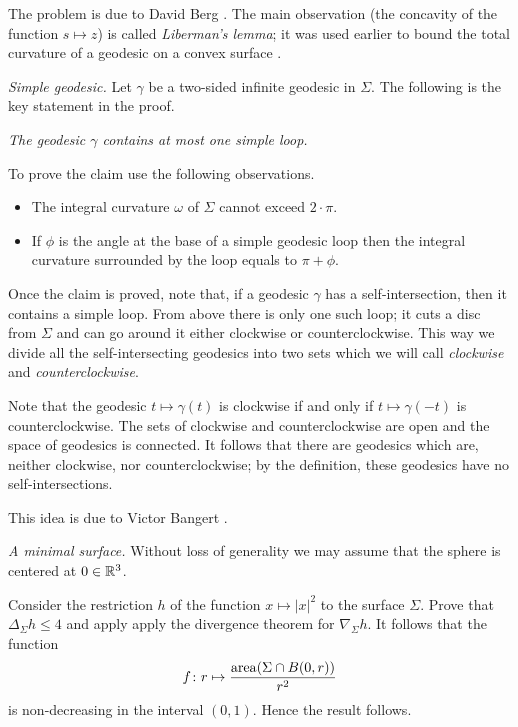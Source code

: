 The problem is due to David Berg \cite[see][]{berg}.
The main observation (the concavity of the function $s\mapsto z$)
is called \emph{Liberman’s lemma}; 
it was used earlier 
to bound the total curvature
of a geodesic on a convex surface \cite[see][]{liberman}.

\textit{Simple geodesic.}
Let $\gamma$ be a two-sided infinite geodesic in $\Sigma$.
The following is the key statement in the proof.

{\it The geodesic $\gamma$ contains at most one simple loop.}
\medskip

To prove the claim use the following observations.
\begin{itemize}
\item The integral curvature $\omega$ of $\Sigma$ cannot exceed $2\cdot\pi$.
\item If $\phi$ is the angle at the base of a simple geodesic loop then the integral curvature surrounded by the loop equals to $\pi+\phi$.
\end{itemize}

Once the claim is proved, 
note that, 
if a geodesic $\gamma$ has a self-intersection,
then it contains a simple loop.
From above there is only one such loop;
it cuts a disc from $\Sigma$ 
and can go around it either clockwise or counterclockwise.
This way we divide all the self-intersecting geodesics 
into two sets which we will call \emph{clockwise} and \emph{counterclockwise}.

Note that the geodesic $t\mapsto \gamma(t)$ is clockwise 
if and only if 
$t\mapsto \gamma(-t)$
is counterclockwise.
The sets of clockwise and counterclockwise are open and the space of geodesics is connected. 
It follows that there are geodesics 
which are, neither clockwise, nor counterclockwise;
by the definition, these geodesics have no self-intersections.

This idea is due to 
Victor Bangert \cite[see Cor. 2 in][]{bangert}.

\textit{A minimal surface.}
Without loss of generality we may assume that the sphere is centered at $0\in\mathbb{R}^3$.

Consider the restriction $h$ of the function $x\mapsto |x|^2$ to the surface $\Sigma$.
Prove that $\Delta_\Sigma h\le 4$ and apply apply the divergence theorem for $\nabla_\Sigma h$.
It follows that the function
\[f\colon r\mapsto \frac{\operatorname{\rm area}(\Sigma\cap B(0,r))}{r^2}
\]
is non-decreasing in the interval $(0,1)$.
Hence the result follows.

